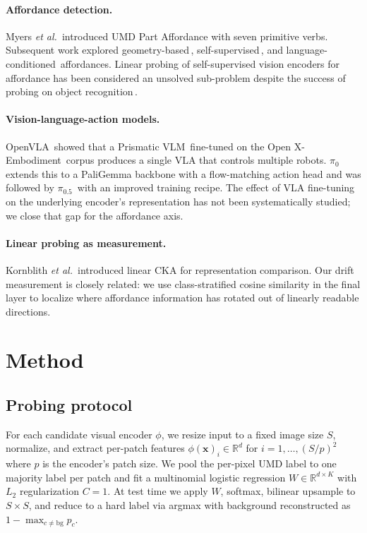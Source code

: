 \documentclass[10pt]{article}
\begin{document}
\paragraph{Affordance detection.} Myers \emph{et al.}\,\cite{myers2015affordance}
introduced UMD Part Affordance with seven primitive verbs. Subsequent work
explored geometry-based\,\cite{kokic2017affordances},
self-supervised\,\cite{nagarajan2019grounded}, and
language-conditioned\,\cite{ahn2022saycan,liu2024voltron} affordances.
Linear probing of self-supervised vision encoders for affordance has been
considered an unsolved sub-problem despite the success of probing on object
recognition\,\cite{he2022masked}.

\paragraph{Vision-language-action models.} OpenVLA\,\cite{kim2024openvla}
showed that a Prismatic VLM\,\cite{karamcheti2024prismatic} fine-tuned on the
Open X-Embodiment\,\cite{padalkar2024oxe} corpus produces a single VLA that
controls multiple robots. $\pi_0$\,\cite{black2024pi0} extends this to a
PaliGemma backbone with a flow-matching action head and was followed by
$\pi_{0.5}$\,\cite{intelligence2024pi05} with an improved training recipe.
The effect of VLA fine-tuning on the underlying encoder's representation has
not been systematically studied; we close that gap for the affordance axis.

\paragraph{Linear probing as measurement.} Kornblith
\emph{et al.}\,\cite{kornblith2019similarity} introduced linear CKA for
representation comparison. Our drift measurement is closely related: we use
class-stratified cosine similarity in the final layer to localize where
affordance information has rotated out of linearly readable directions.

\section{Method}

\subsection{Probing protocol}

For each candidate visual encoder $\phi$, we resize input to a fixed image
size $S$, normalize, and extract per-patch features $\phi(\mathbf{x})_i \in
\mathbb{R}^d$ for $i = 1, \dots, (S/p)^2$ where $p$ is the encoder's patch
size. We pool the per-pixel UMD label to one majority label per patch and
fit a multinomial logistic regression $W \in \mathbb{R}^{d \times K}$ with
$L_2$ regularization $C = 1$. At test time we apply $W$, softmax, bilinear
upsample to $S \times S$, and reduce to a hard label via argmax with
background reconstructed as $1 - \max_{c \neq \text{bg}} p_c$.
\end{document}
